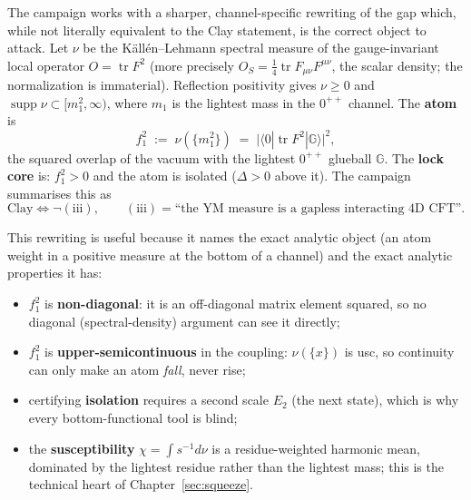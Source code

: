 The campaign works with a sharper, channel-specific rewriting of the gap which, while not
literally equivalent to the Clay statement, is the correct object to attack. Let $\nu$ be the
K\"all\'en--Lehmann spectral measure of the gauge-invariant local operator
$O=\operatorname{tr}F^2$ (more precisely $O_S=\tfrac14\operatorname{tr}F_{\mu\nu}F^{\mu\nu}$,
the scalar density; the normalization is immaterial). Reflection positivity gives $\nu\ge0$
and $\operatorname{supp}\nu\subset[m_1^2,\infty)$, where $m_1$ is the lightest mass in the
$0^{++}$ channel. The \textbf{atom} is
\begin{equation}
f_1^2 \;:=\; \nu(\{m_1^2\}) \;=\; \bigl|\langle 0|\operatorname{tr}F^2|\mathbb{G}\rangle\bigr|^2 ,
\label{eq:atom}
\end{equation}
the squared overlap of the vacuum with the lightest $0^{++}$ glueball $\mathbb{G}$. The
\textbf{lock core} is: $f_1^2>0$ and the atom is isolated ($\Delta>0$ above it). The campaign
summarises this as
\begin{equation}
\text{Clay}\iff\neg(\mathrm{iii}),\qquad
(\mathrm{iii})=\text{``the YM measure is a gapless interacting 4D CFT''.}
\label{eq:lockcore}
\end{equation}

This rewriting is useful because it names the exact analytic object (an atom weight in a positive
measure at the bottom of a channel) and the exact analytic properties it has:
\begin{itemize}
\item $f_1^2$ is \textbf{non-diagonal}: it is an off-diagonal matrix element squared, so no
  diagonal (spectral-density) argument can see it directly;
\item $f_1^2$ is \textbf{upper-semicontinuous} in the coupling: $\nu(\{x\})$ is usc, so
  continuity can only make an atom \emph{fall}, never rise;
\item certifying \textbf{isolation} requires a second scale $E_2$ (the next state), which is why
  every bottom-functional tool is blind;
\item the \textbf{susceptibility} $\chi=\int s^{-1}d\nu$ is a residue-weighted harmonic mean,
  dominated by the lightest residue rather than the lightest mass; this is the technical heart of
  Chapter~\ref{sec:squeeze}.
\end{itemize}


